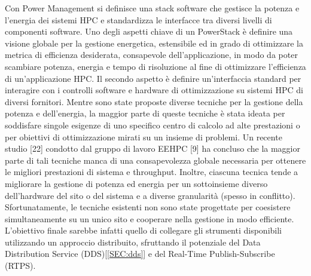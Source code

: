 Con Power Management si definisce una stack software che gestisce la potenza e l'energia dei sistemi HPC e standardizza le interfacce tra diversi livelli di componenti software. Uno degli aspetti chiave di un PowerStack è definire una visione globale per la gestione energetica, estensibile ed in grado di ottimizzare la metrica di efficienza desiderata, consapevole dell'applicazione, in modo da poter scambiare potenza, energia e tempo di risoluzione al fine di ottimizzare l'efficienza di un'applicazione HPC. Il secondo aspetto è definire un'interfaccia standard per interagire con i controlli software e hardware di ottimizzazione su sistemi HPC di diversi fornitori.
Mentre sono state proposte diverse tecniche per la gestione della potenza e dell'energia, la maggior parte di queste tecniche è stata ideata per soddisfare singole esigenze di uno specifico centro di calcolo ad alte prestazioni o per obiettivi di ottimizzazione mirati su un insieme di problemi. Un recente studio [22] condotto dal gruppo di lavoro EEHPC [9] ha concluso che la maggior parte di tali tecniche manca di una consapevolezza globale necessaria per ottenere le migliori prestazioni di sistema e throughput. Inoltre, ciascuna tecnica tende a migliorare la gestione di potenza ed energia per un sottoinsieme diverso dell'hardware del sito o del sistema e a diverse granularità (spesso in conflitto). Sfortunatamente, le tecniche esistenti non sono state progettate per coesistere simultaneamente su un unico sito e cooperare nella gestione in modo efficiente. %
L'obiettivo finale sarebbe infatti quello di collegare gli strumenti disponibili utilizzando un approccio distribuito, sfruttando il potenziale del Data Distribution Service (DDS)[\ref{SEC:dds}] e del Real-Time Publish-Subscribe (RTPS).


